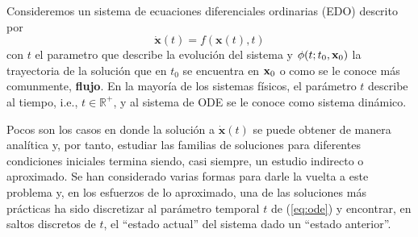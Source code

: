 Consideremos un sistema de ecuaciones diferenciales ordinarias (EDO) descrito por 
\begin{equation}
\dot{\mathbf{x}}(t) = f(\mathbf{x}(t),t)
\label{eq:ode}
\end{equation}
con $t$ el parametro que describe la evolución del sistema y $\phi(t;t_0,\mathbf{x}_0)$ la trayectoria de la solución que en $t_0$ se encuentra en $\mathbf{x}_0$ o como se le conoce más comunmente, \textbf{flujo}. En la mayoría de los sistemas físicos, el parámetro $t$ describe al tiempo, i.e., $t \in \mathbb{R}^+$, y al sistema de ODE se le conoce como sistema dinámico.

Pocos son los casos en donde la solución a $\dot{\mathbf{x}}(t)$ se puede obtener de manera analítica y, por tanto, estudiar las familias de soluciones para diferentes condiciones iniciales termina siendo, casi siempre, un estudio indirecto o aproximado. Se han considerado varias formas para darle la vuelta a este problema y, en los esfuerzos de lo aproximado, una de las soluciones más prácticas ha sido discretizar al parámetro temporal $t$ de (\ref{eq:ode}) y encontrar, en saltos discretos de $t$, el ``estado actual'' del sistema dado un ``estado anterior''.

